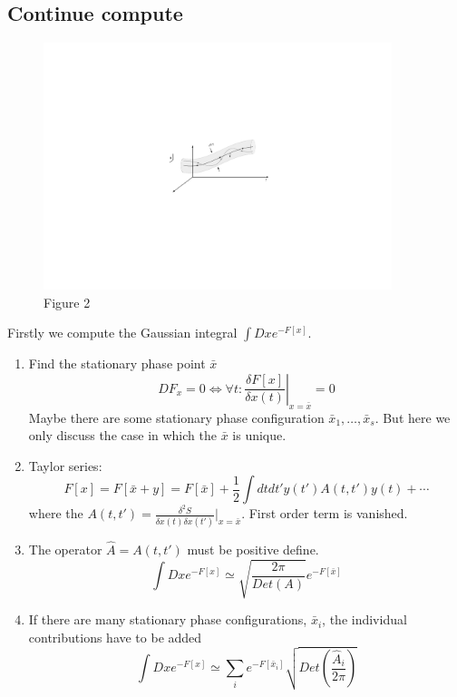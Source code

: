 \documentclass[a4paper,11pt]{article}
\begin{document}
\subsection{Continue compute}
\begin{figure}[H]
  \centering
  \includegraphics[width=4in]{2.pdf}
  \caption{Figure 2}
\end{figure}
Firstly we compute the Gaussian integral $\int Dx e^{-F[x]}$.
\begin{enumerate}
  \item Find the stationary phase point $\bar{x}$
  \begin{equation*}
    DF_x=0\Leftrightarrow\forall t:\left.\frac{\delta F[x]}{\delta x(t)}\right|_{x=\bar{x}}=0
  \end{equation*}
  Maybe there are some stationary phase configuration $\bar{x}_1,\dots,\bar{x}_s$. But here we only discuss the case in which the $\bar{x}$ is unique.
  \item Taylor series:
  \begin{equation*}
    F[x]=F[\bar{x}+y]=F[\bar{x}]+\frac{1}{2}\int dtdt' y(t')A(t,t')y(t)+\cdots
  \end{equation*}
  where the $A(t,t')=\frac{\delta^2 S}{\delta x(t)\delta x(t')}|_{x=\bar{x}}$. First order term is vanished.
  \item The operator $\hat{A}={A(t,t')}$ must be positive define.
  \begin{equation*}
    \int Dxe^{-F[x]}\simeq \sqrt{\frac{2\pi}{Det(A)}}e^{-F[\bar{x}]}
  \end{equation*}
  \item If there are many stationary phase configurations, $\bar{x}_i$, the individual contributions have to be added
  \begin{equation*}
    \int Dxe^{-F[x]}\simeq\sum_{i}e^{-F[\bar{x}_i]}\sqrt{Det\left(\frac{\hat{A}_i}{2\pi}\right)}
  \end{equation*}
\end{enumerate}
\end{document}
